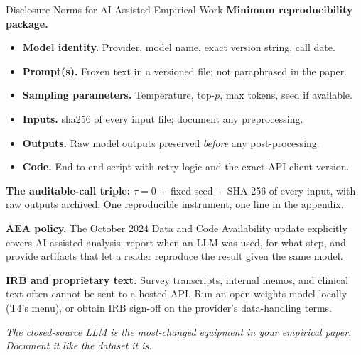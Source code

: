 \begin{frame}{Disclosure Norms for AI-Assisted Empirical Work}
\footnotesize
\textbf{Minimum reproducibility package.}
\begin{itemize}\itemsep1pt
  \item \textbf{Model identity.} Provider, model name, exact version string, call date.
  \item \textbf{Prompt(s).} Frozen text in a versioned file; not paraphrased in the paper.
  \item \textbf{Sampling parameters.} Temperature, top-$p$, max tokens, seed if available.
  \item \textbf{Inputs.} sha256 of every input file; document any preprocessing.
  \item \textbf{Outputs.} Raw model outputs preserved \emph{before} any post-processing.
  \item \textbf{Code.} End-to-end script with retry logic and the exact API client version.
\end{itemize}

\smallskip
\begin{takeawaybox}
\textbf{The auditable-call triple:} $\tau = 0$ $+$ fixed seed $+$ SHA-256 of every input, with raw outputs archived. One reproducible instrument, one line in the appendix.
\end{takeawaybox}

\smallskip
\textbf{AEA policy.} The October 2024 Data and Code Availability update explicitly covers AI-assisted analysis: report when an LLM was used, for what step, and provide artifacts that let a reader reproduce the result given the same model.

\smallskip
\textbf{IRB and proprietary text.} Survey transcripts, internal memos, and clinical text often cannot be sent to a hosted API. Run an open-weights model locally (T4's menu), or obtain IRB sign-off on the provider's data-handling terms.

\smallskip
\textit{The closed-source LLM is the most-changed equipment in your empirical paper. Document it like the dataset it is.}
\end{frame}

